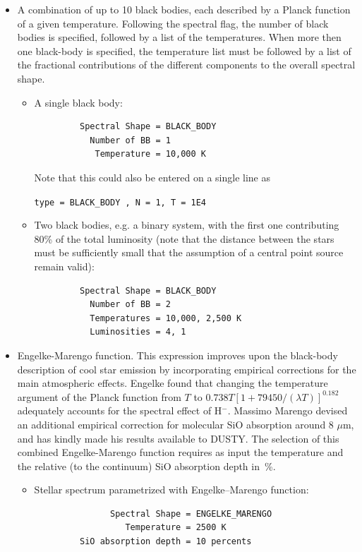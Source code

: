 \documentclass[11pt]{article}
\def\mic    {\hbox{$\mu$m}}
\begin{document}
\begin{itemize}
%
\item A combination of up to 10 black bodies, each described by a
  Planck function of a given temperature. Following the spectral flag,
  the number of black bodies is specified, followed by a list of the
  temperatures. When more then one black-body is specified, the
  temperature list must be followed by a list of the fractional
  contributions of the different components to the overall spectral
  shape.
%
  \begin{itemize}
%
  \item A single black body:
\begin{verbatim}
         Spectral Shape = BLACK_BODY
           Number of BB = 1
            Temperature = 10,000 K
\end{verbatim}

    Note that this could also be entered on a single line as

    \hskip 1in {\tt type = BLACK\_BODY , N = 1, T = 1E4}

  \item Two black bodies, e.g. a binary system, with the first one
    contributing 80\% of the total luminosity (note that the distance
    between the stars must be sufficiently small that the assumption
    of a central point source remain valid):
\begin{verbatim}
         Spectral Shape = BLACK_BODY
           Number of BB = 2
           Temperatures = 10,000, 2,500 K
           Luminosities = 4, 1
\end{verbatim}

  \end{itemize}

\item Engelke-Marengo function.  This expression improves upon the
  black-body description of cool star emission by incorporating
  empirical corrections for the main atmospheric effects. Engelke
  \cite{Engelk} found that changing the temperature argument of the
  Planck function from $T$ to $0.738T[1 + 79450/(\lambda T)]^{0.182}$
  adequately accounts for the spectral effect of H$^-$. Massimo
  Marengo \cite{Mareng} devised an additional empirical correction for
  molecular SiO absorption around 8 \mic, and has kindly made his
  results available to DUSTY. The selection of this combined
  Engelke-Marengo function requires as input the temperature and the
  relative (to the continuum) SiO absorption depth in~\%.

  \begin{itemize}
  \item Stellar spectrum parametrized with Engelke--Marengo function:
\begin{verbatim}
               Spectral Shape = ENGELKE_MARENGO
                  Temperature = 2500 K
         SiO absorption depth = 10 percents
\end{verbatim}
  \end{itemize}


\end{itemize}
\end{document}

